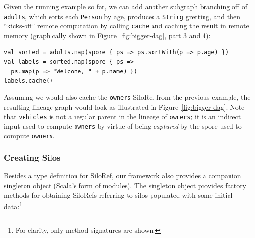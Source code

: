 \documentclass{jfp1}
\begin{document}
Given the running example so far, we can add another subgraph branching off of
\verb|adults|, which sorts each \verb|Person| by age, produces a \verb|String|
gretting, and then ``kicks-off'' remote computation by calling \verb|cache| and
caching the result in remote memory (graphically shown in
Figure~\ref{fig:bigger-dag}, part 3 and 4):

\begin{lstlisting}
val sorted = adults.map(spore { ps => ps.sortWith(p => p.age) })
val labels = sorted.map(spore { ps =>
  ps.map(p => "Welcome, " + p.name) })
labels.cache()
\end{lstlisting}
\noindent
Assuming we would also cache the \verb|owners| SiloRef from the previous
example, the resulting lineage graph would look as illustrated in
Figure~\ref{fig:bigger-dag}. Note that \verb|vehicles| is not a regular parent
in the lineage of \verb|owners|; it is an indirect input used to compute
\verb|owners| by virtue of being {\em captured} by the spore used to compute
\verb|owners|.



%

\subsubsection{Creating Silos}
\label{sec:creating-silos}

Besides a type definition for SiloRef, our framework also provides a companion
singleton object (Scala's form of modules). The singleton object provides
factory methods for obtaining SiloRefs referring to silos populated with some
initial data:\footnote{For clarity, only method signatures are shown.}
\end{document}
